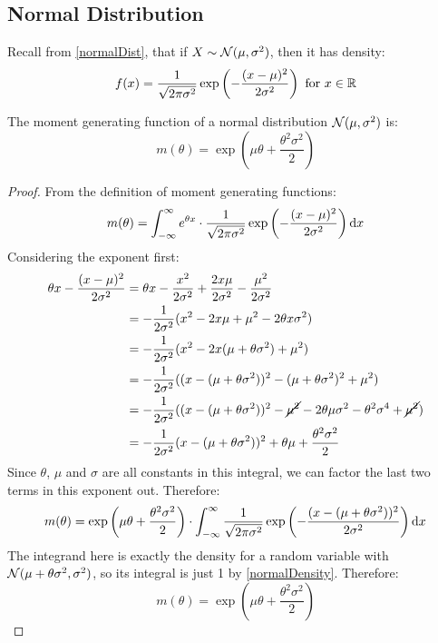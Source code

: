 \documentclass[../main.tex]{subfiles}
\begin{document}
\subsection{Normal Distribution}
\begin{remark}[Recap]
  Recall from \cref{normalDist}, that if $X \sim \operatorname{\mathcal{N}}(\mu, \sigma^2)$, then it has density:
  \[
    f(x) = \frac{1}{\sqrt{2\pi \sigma^2}}\exp\left(- \frac{(x - \mu)^2}{2\sigma^2}\right) \text{ for $x \in \mathbb{R}$}
  \]
\end{remark}
\begin{proposition}
  The moment generating function of a normal distribution $\operatorname{\mathcal{N}}(\mu, \sigma^2)$ is: \label{mgfNormal}
  \[
    m(\theta) = \exp\left(\mu \theta + \frac{\theta^2 \sigma^2}{2}\right)
  \]
\end{proposition}
\begin{proof}
  From the definition of moment generating functions:
  \begin{align*}
    m(\theta) = \int_{-\infty}^{\infty} e^{\theta x} \cdot \frac{1}{\sqrt{2 \pi \sigma^2}}\exp\left(- \frac{(x - \mu)^2}{2\sigma^2}\right) \d{x}
  \end{align*}
  Considering the exponent first:
  \begin{align*}
    \theta x - \frac{(x - \mu)^2}{2 \sigma^2} &= \theta x - \frac{x^2}{2\sigma^2} + \frac{2x\mu}{2\sigma^2} - \frac{\mu^2}{2\sigma^2} \\
                                              &= -\frac{1}{2\sigma^2} (x^2 - 2x \mu + \mu^2 - 2\theta x \sigma^2) \\
                                              &= -\frac{1}{2\sigma^2} (x^2 - 2x (\mu + \theta \sigma^2) + \mu^2) \\
                                              &= -\frac{1}{2\sigma^2} ((x - (\mu + \theta \sigma^2))^2 - (\mu + \theta\sigma^2)^2 + \mu^2) \\
                                              &= -\frac{1}{2\sigma^2} ((x - (\mu + \theta \sigma^2))^2 - \cancel{\mu^2} -2\theta\mu\sigma^2 - \theta^2\sigma^4 + \cancel{\mu^2}) \\
                                              &= -\frac{1}{2\sigma^2} (x - (\mu + \theta \sigma^2))^2 + \theta\mu + \frac{\theta^2\sigma^2}{2}
  \end{align*}
  Since $\theta$, $\mu$ and $\sigma$ are all constants in this integral, we can factor the last two terms in this exponent out.
  Therefore:
  \[
    m(\theta) = \exp\left(\mu \theta + \frac{\theta^2 \sigma^2}{2}\right) \cdot \int_{-\infty}^{\infty} \frac{1}{\sqrt{2\pi \sigma^2}} \exp\left(- \frac{(x - (\mu + \theta \sigma^2))^2}{2\sigma^2}\right) \d{x}
  \]
  The integrand here is exactly the density for a random variable with $\operatorname{\mathcal{N}}(\mu + \theta \sigma^2, \sigma^2)$, so its integral is just 1 by \cref{normalDensity}.
  Therefore:
  \[
    m(\theta) = \exp\left(\mu \theta + \frac{\theta^2 \sigma^2}{2}\right)
  \]
\end{proof}
\end{document}
